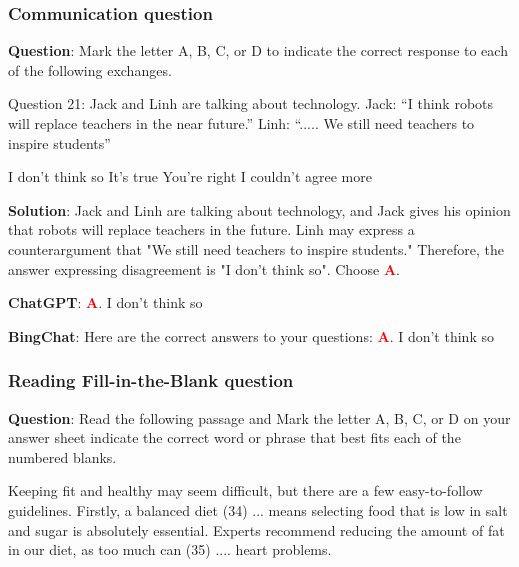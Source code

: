 \documentclass{article}
\begin{document}
{\begin{mdframed}[linewidth=1pt,linecolor=red]
	\end{mdframed}
	
	\subsubsection{Communication question}
	\label{VNHSGE_Eng_C}
	
	
	\begin{mdframed}[linewidth=1pt,linecolor=red] \textbf{Question}: Mark the letter A, B, C, or D to indicate the correct response to each of the following exchanges.
		
		Question 21: Jack and Linh are talking about technology.
		Jack: “I think robots will replace teachers in the near future.” 
		Linh: “..... We still need teachers to inspire students”
		
		\begin{oneparchoices}
			\choice I don’t think so	
			\choice It’s true	
			\choice You’re right	
			\choice I couldn’t agree more
		\end{oneparchoices}
		
		\textbf{Solution}: Jack and Linh are talking about technology, and Jack gives his opinion that robots will replace teachers in the future. Linh may express a counterargument that "We still need teachers to inspire students." Therefore, the answer expressing disagreement is 
		"I don’t think so". Choose \textcolor{red}{\textbf{A}}. 
		
		\textbf{ChatGPT}: \textcolor{red}{\textbf{A}}. I don’t think so
		
		\textbf{BingChat}: Here are the correct answers to your questions: \textcolor{red}{\textbf{A}}. I don’t think so
		
		
	\end{mdframed}
	
	\subsubsection{Reading Fill-in-the-Blank question}
	\label{VNHSGE_Eng_RB}
	
	\begin{mdframed}[linewidth=1pt,linecolor=red] \textbf{Question}: Read the following passage and Mark the letter A, B, C, or D on your answer sheet indicate the correct word or phrase that best fits each of the numbered blanks.
		
		Keeping fit and healthy may seem difficult, but there are a few easy-to-follow guidelines. Firstly, a balanced diet (34) ... means selecting food that is low in salt and sugar is absolutely essential. Experts recommend reducing the amount of fat in our diet, as too much can (35) .... heart problems. 
		

\end{mdframed}}
\end{document}
